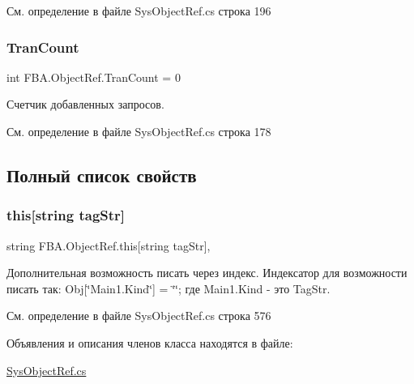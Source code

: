 См. определение в файле Sys\+Object\+Ref.\+cs строка 196

\mbox{\label{class_f_b_a_1_1_object_ref_a216c7fe78cd63288b35516e33fa1013f}} 
\subsubsection{\texorpdfstring{Tran\+Count}{TranCount}}
{\footnotesize\ttfamily int F\+B\+A.\+Object\+Ref.\+Tran\+Count = 0}



Счетчик добавленных запросов. 



См. определение в файле Sys\+Object\+Ref.\+cs строка 178



\subsection{Полный список свойств}
\mbox{\label{class_f_b_a_1_1_object_ref_a83b1ca9388ad3146af7147360707da55}} 
\subsubsection{\texorpdfstring{this[string tag\+Str]}{this[string tagStr]}}
{\footnotesize\ttfamily string F\+B\+A.\+Object\+Ref.\+this\mbox{[}string tag\+Str\mbox{]}\hspace{0.3cm}{\ttfamily [get]}, {\ttfamily [set]}}



Дополнительная возможность писать через индекс. Индексатор для возможности писать так\+: Obj\mbox{[}\char`\"{}\+Main1.\+Kind\char`\"{}\mbox{]} = \char`\"{}\char`\"{}; где Main1.\+Kind -\/ это Tag\+Str. 



См. определение в файле Sys\+Object\+Ref.\+cs строка 576



Объявления и описания членов класса находятся в файле\+:\begin{DoxyCompactItemize}
\item 
\mbox{\hyperlink{_sys_object_ref_8cs}{Sys\+Object\+Ref.\+cs}}\end{DoxyCompactItemize}

